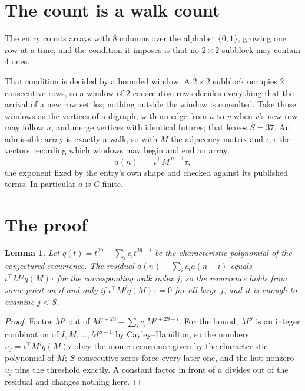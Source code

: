 \documentclass[11pt,a4paper]{article}
\theoremstyle{plain}
\newtheorem{lemma}[theorem]{Lemma}
\theoremstyle{definition}
\begin{document}
\section{The count is a walk count}

The entry counts arrays with $8$ columns over the alphabet $\{0,1\}$, growing one row at a time, and the condition it imposes is that no $2\times2$ subblock may contain $4$ ones.

That condition is decided by a bounded window. A $2\times2$ subblock occupies $2$ consecutive rows, so a window of $2$ consecutive rows decides everything that the arrival of a new row settles; nothing outside the window is consulted. Take those windows as the vertices of a digraph, with an edge from $u$ to $v$ when $v$'s new row may follow $u$, and merge vertices with identical futures; that leaves $S=37$. An admissible array is exactly a walk, so with $M$ the adjacency matrix and $\iota,\tau$ the vectors recording which windows may begin and end an array,
\[
a(n)\;=\;\iota^{\!\top}M^{\,n-1}\tau ,
\]
the exponent fixed by the entry's own shape and checked against its published terms. In
particular $a$ is $C$-finite.

\section{The proof}

\begin{lemma}\label{lem:crit}
Let $q(t)=t^{29}-\sum_i c_it^{29-i}$ be the characteristic polynomial of the
conjectured recurrence. The residual $a(n)-\sum_ic_ia(n-i)$ equals
$\iota^{\!\top}M^{\,j}q(M)\tau$ for the corresponding walk index $j$, so the recurrence
holds from some point on if and only if $\iota^{\!\top}M^{j}q(M)\tau=0$ for all large $j$,
and it is enough to examine $j<S$.
\end{lemma}

\begin{proof}
Factor $M^{j}$ out of $M^{j+29}-\sum_ic_iM^{j+29-i}$. For the bound, $M^{S}$
is an integer combination of $I,M,\dots,M^{S-1}$ by Cayley--Hamilton, so the numbers
$u_j=\iota^{\!\top}M^{j}q(M)\tau$ obey the monic recurrence given by the characteristic
polynomial of $M$; $S$ consecutive zeros force every later one, and the last nonzero $u_j$
pins the threshold exactly. A constant factor in front of $a$ divides out of the residual and
changes nothing here.
\end{proof}
\end{document}
